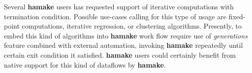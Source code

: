 \documentclass[10pt,conference,letterpaper]{IEEEtran}
\begin{document}
Several \textbf{hamake} users has requested support of iterative computations
with termination condition. Possible use-cases calling for this type
of usage are fixed-point computations, iterative regression, or
clustering algorithms. Presently, to embed this kind of algorithms
into \textbf{hamake} work flow require use of \textit{generations} feature
combined with external automation, invoking \textbf{hamake} repeatedly until
certain exit condition it satisfied. \textbf{hamake} users could
certainly benefit from native support for this kind of dataflows by
\textbf{hamake}.

\nocite{*}


\end{document}
